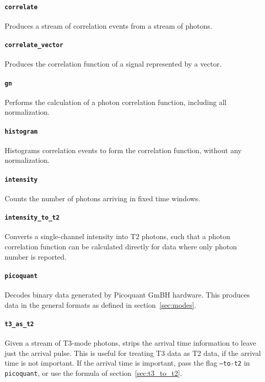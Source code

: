 \documentclass{article}
\newcommand{\program}[1]{\texttt{#1}}
\numberwithin{equation}{section}
\numberwithin{figure}{section}
\begin{document}
\paragraph{\program{correlate}}
Produces a stream of correlation events from a stream of photons.

\paragraph{\program{correlate\_vector}}
Produces the correlation function of a signal represented by a vector.

\paragraph{\program{gn}}
Performs the calculation of a photon correlation function, including all normalization.

\paragraph{\program{histogram}}
Histograms correlation events to form the correlation function, without any normalization.

\paragraph{\program{intensity}}
Counts the number of photons arriving in fixed time windows.

\paragraph{\program{intensity\_to\_t2}}
Converts a single-channel intensity into T2 photons, such that a photon correlation function can be calculated directly for data where only photon number is reported.

\paragraph{\program{picoquant}}
Decodes binary data generated by Picoquant GmBH hardware. This produces data in the general formats as defined in section~\ref{sec:modes}.

\paragraph{\program{t3\_as\_t2}}
Given a stream of T3-mode photons, strips the arrival time information to leave just the arrival pulse. This is useful for treating T3 data as T2 data, if the arrival time is not important. If the arrival time is important, pass the flag \texttt{--to-t2} in \program{picoquant}, or use the formula of section~\ref{sec:t3_to_t2}.







\end{document}
